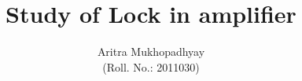 \documentclass[10pt]{article}
\title{\textbf{Study of Lock in amplifier}}
\author{Aritra Mukhopadhyay\\(Roll. No.: 2011030)}
\date{}
\begin{document}
    \maketitle
    
    \begin{multicols*}{2}
        
        
        

    \end{multicols*}
\end{document}
